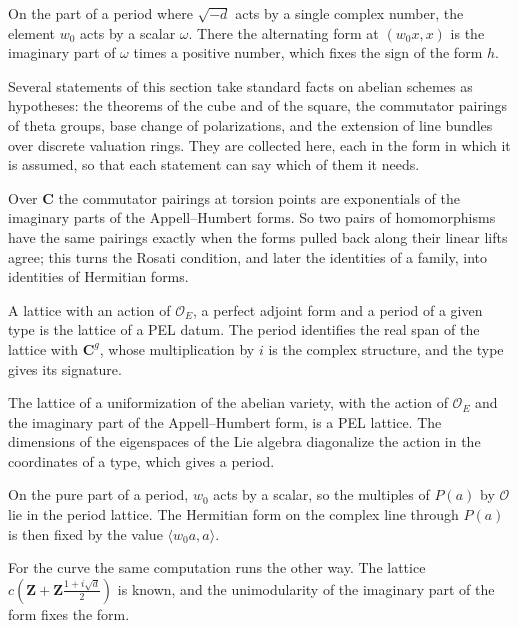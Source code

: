 On the part of a period where $\sqrt{-d}$ acts by a single complex number, the element $w_0$ acts by a scalar $\omega$.
There the alternating form at $(w_0x,x)$ is the imaginary part of $\omega$ times a positive number, which fixes the
sign of the form $h$.

Several statements of this section take standard facts on abelian schemes as hypotheses: the theorems of the cube and
of the square, the commutator pairings of theta groups, base change of polarizations, and the extension of line
bundles over discrete valuation rings. They are collected here, each in the form in which it is assumed, so that each
statement can say which of them it needs.

Over $\mathbf C$ the commutator pairings at torsion points are exponentials of the imaginary parts of the
Appell--Humbert forms. So two pairs of homomorphisms have the same pairings exactly when the forms pulled back along their
linear lifts agree; this turns the Rosati condition, and later the identities of a family, into identities of Hermitian
forms.

A lattice with an action of $\mathcal O_E$, a perfect adjoint form and a period of a given type is the lattice of a PEL
datum. The period identifies the real span of the lattice with $\mathbf C^g$, whose multiplication by $i$ is the complex
structure, and the type gives its signature.

The lattice of a uniformization of the abelian variety, with the action of $\mathcal O_E$ and the imaginary part of the
Appell--Humbert form, is a PEL lattice. The dimensions of the eigenspaces of the Lie algebra diagonalize the action in
the coordinates of a type, which gives a period.

On the pure part of a period, $w_0$ acts by a scalar, so the multiples of $P(a)$ by $\mathcal O$ lie in the period
lattice. The Hermitian form on the complex line through $P(a)$ is then fixed by the value $\langle w_0a,a\rangle$.

For the curve the same computation runs the other way. The lattice $c(\mathbf Z+\mathbf Z\frac{1+i\sqrt d}2)$ is known,
and the unimodularity of the imaginary part of the form fixes the form.

